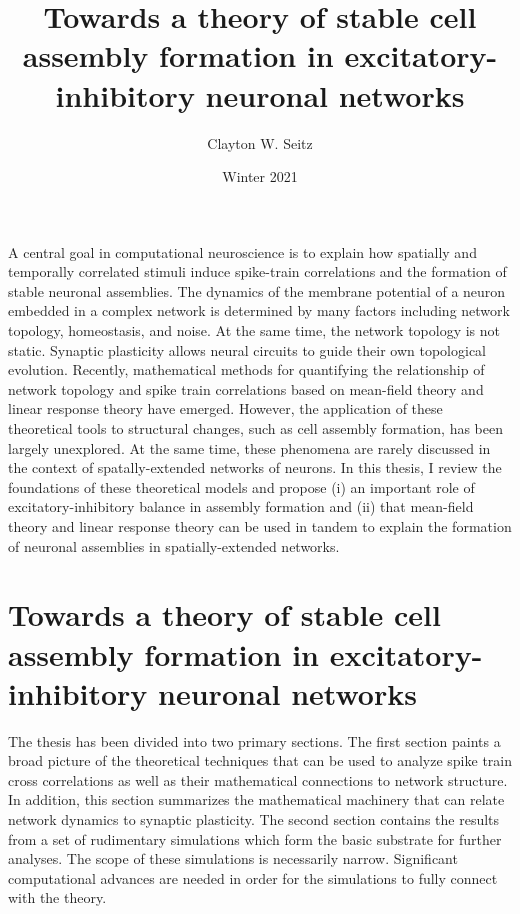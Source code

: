 \documentclass{ucetd}
\title{Towards a theory of stable cell assembly formation in excitatory-inhibitory neuronal networks}
\author{Clayton W. Seitz}
\date{Winter 2021}
\begin{document}
\maketitle

\makecopyright
\makeepigraph


\tableofcontents


\abstract

A central goal in computational neuroscience is to explain how spatially and temporally correlated stimuli induce spike-train correlations and the formation of stable neuronal assemblies. The dynamics of the membrane potential of a neuron embedded in a complex network is determined by many factors including network topology, homeostasis, and noise. At the same time, the network topology is not static. Synaptic plasticity allows neural circuits to guide their own topological evolution. Recently, mathematical methods for quantifying the relationship of network topology and spike train correlations based on mean-field theory and linear response theory have emerged. However, the application of these theoretical tools to structural changes, such as cell assembly formation, has been largely unexplored. At the same time, these phenomena are rarely discussed in the context of spatally-extended networks of neurons. In this thesis, I review the foundations of these theoretical models and propose (i) an important role of excitatory-inhibitory balance in assembly formation and (ii) that mean-field theory and linear response theory can be used in tandem to explain the formation of neuronal assemblies in spatially-extended networks.

\clearpage

\mainmatter

\chapter{Towards a theory of stable cell assembly formation in excitatory-inhibitory neuronal networks}

The thesis has been divided into two primary sections. The first section paints a broad picture of the theoretical techniques that can be used to analyze spike train cross correlations as well as their mathematical connections to network structure. In addition, this section summarizes the mathematical machinery that can relate network dynamics to synaptic plasticity. The second section contains the results from a set of rudimentary simulations which form the basic substrate for further analyses. The scope of these simulations is necessarily narrow. Significant computational advances are needed in order for the simulations to fully connect with the theory.
\end{document}
